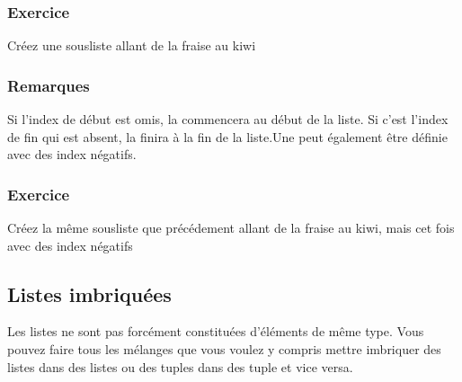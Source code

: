 \documentclass[letterpaper,10pt,english]{sphinxmanual}
\begin{document}
\subsubsection{Exercice}
\label{\detokenize{src/OCI02_Listes:exercice}}
Créez une sous\sphinxhyphen{}liste allant de la fraise au kiwi

\begin{sphinxVerbatim}[commandchars=\\\{\}]
  \PYG{p}{[}      \PYG{p}{]}
\end{sphinxVerbatim}

\begin{sphinxVerbatim}[commandchars=\\\{\}]
  \PYG{p}{[}\PYG{p}{]}
\end{sphinxVerbatim}


\subsubsection{Remarques}
\label{\detokenize{src/OCI02_Listes:remarques}}
Si l’index de début est omis, la  commencera au début de la liste. Si c’est l’index de fin qui est absent, la  finira à la fin de la liste.Une  peut également être définie avec des index négatifs.


\subsubsection{Exercice}
\label{\detokenize{src/OCI02_Listes:id1}}
Créez la même sous\sphinxhyphen{}liste que précédement allant de la fraise au kiwi, mais cet fois avec des index négatifs


\subsection{Listes imbriquées}
\label{\detokenize{src/OCI02_Listes:listes-imbriquees}}
Les listes ne sont pas forcément constituées d’éléments de même type. Vous pouvez faire tous les mélanges que vous voulez y compris mettre imbriquer des listes dans des listes ou des tuples dans des tuple et vice versa.
\end{document}

